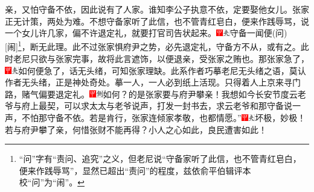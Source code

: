 亲，又怕守备不依，因此说有了人家。谁知李公子执意不依，定要娶他女儿。张家正无计策，两处为难。不想守备家听了此信，也不管青红皂白，便来作践辱骂，说一个女儿许几家，偏不许退定礼，就要打官司告状起来。{\includegraphics[width=3mm]{../Images/00002}\includegraphics[width=3mm]{../Images/00012}\footnotesize \kaishu 守备一闻便{(问)}{[}闹{]}\footnote{“问”字有“责问、追究”之义，但老尼说“守备家听了此信，也不管青红皂白，便来作践辱骂”，显然已超出“责问”的程度，兹依俞平伯辑评本校“问”为“闹”。}，断无此理。此不过张家惧府尹之势，必先退定礼，守备方不从，或有之。此时老尼只欲与张家完事，故将此言遮饰，以便退亲，受张家之贿也。}那张家急了，{\includegraphics[width=3mm]{../Images/00002}\includegraphics[width=3mm]{../Images/00012}\footnotesize \kaishu 如何便急了，话无头绪，可知张家理缺。此系作者巧摹老尼无头绪之语，莫认作者无头绪，正是神处奇处。摹一人，一人必到纸上活现。}只得着人上京来寻门路，赌气偏要退定礼。{\includegraphics[width=3mm]{../Images/00002}\includegraphics[width=3mm]{../Images/00011}\footnotesize \kaishu 如何？的是张家要与府尹攀亲！}我想如今长安节度云老爷与府上最契，可以求太太与老爷说声，打发一封书去，求云老爷和那守备说一声，不怕那守备不依。若是肯行，张家连倾家孝敬，也都情愿。”{\includegraphics[width=3mm]{../Images/00002}\includegraphics[width=3mm]{../Images/00012}\footnotesize \kaishu 坏极，妙极！若与府尹攀了亲，何惜张财不能再得？小人之心如此，良民遭害如此！}

